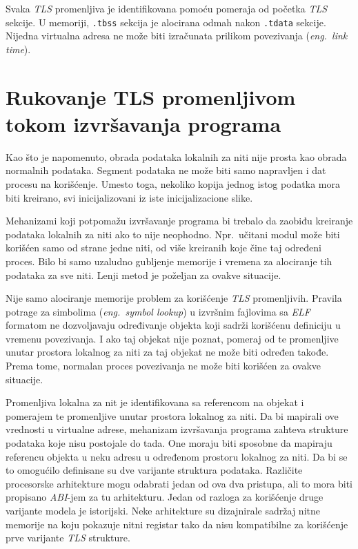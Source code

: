 \documentclass[12pt,oneside]{memoir}
\begin{document}
Svaka \emph{TLS} promenljiva je identifikovana pomoću pomeraja od početka \emph{TLS} sekcije. U memoriji, \texttt{.tbss} sekcija je alocirana odmah nakon \texttt{.tdata} sekcije. Nijedna virtualna adresa ne može biti izračunata prilikom povezivanja (\emph{eng.~link time}).

\section{Rukovanje TLS promenljivom tokom izvršavanja programa}

Kao što je napomenuto, obrada podataka lokalnih za niti nije prosta kao obrada normalnih podataka. Segment podataka ne može biti samo napravljen i dat procesu na korišćenje. Umesto toga, nekoliko kopija jednog istog podatka mora biti kreirano, svi inicijalizovani iz iste inicijalizacione slike.

Mehanizami koji potpomažu izvršavanje programa bi trebalo da zaobiđu kreiranje podataka lokalnih za niti ako to nije neophodno. Npr.~učitani modul može biti korišćen samo od strane jedne niti, od više kreiranih koje čine taj određeni proces. Bilo bi samo uzaludno gubljenje memorije i vremena za alociranje tih podataka za sve niti. Lenji metod je poželjan za ovakve situacije.

Nije samo alociranje memorije problem za korišćenje \emph{TLS} promenljivih. Pravila potrage za simbolima (\emph{eng.~symbol lookup}) u izvršnim fajlovima sa \emph{ELF} formatom ne dozvoljavaju određivanje objekta koji sadrži korišćenu definiciju u vremenu povezivanja. I ako taj objekat nije poznat, pomeraj od te promenljive unutar prostora lokalnog za niti za taj objekat ne može biti određen takođe. Prema tome, normalan proces povezivanja ne može biti korišćen za ovakve situacije.

Promenljiva lokalna za nit je identifikovana sa referencom na objekat i pomerajem te promenljive unutar prostora lokalnog za niti. Da bi mapirali ove vrednosti u virtualne adrese, mehanizam izvršavanja programa zahteva strukture podataka koje nisu postojale do tada. One moraju biti sposobne da mapiraju referencu objekta u neku adresu u određenom prostoru lokalnog za niti. Da bi se to omogućilo definisane su dve varijante struktura podataka. Različite procesorske arhitekture mogu odabrati jedan od ova dva pristupa, ali to mora biti propisano \emph{ABI}-jem za tu arhitekturu. Jedan od razloga za korišćenje druge varijante modela je istorijski. Neke arhitekture su dizajnirale sadržaj nitne memorije na koju pokazuje nitni registar tako da nisu kompatibilne za korišćenje prve varijante \emph{TLS} strukture.
\end{document}
